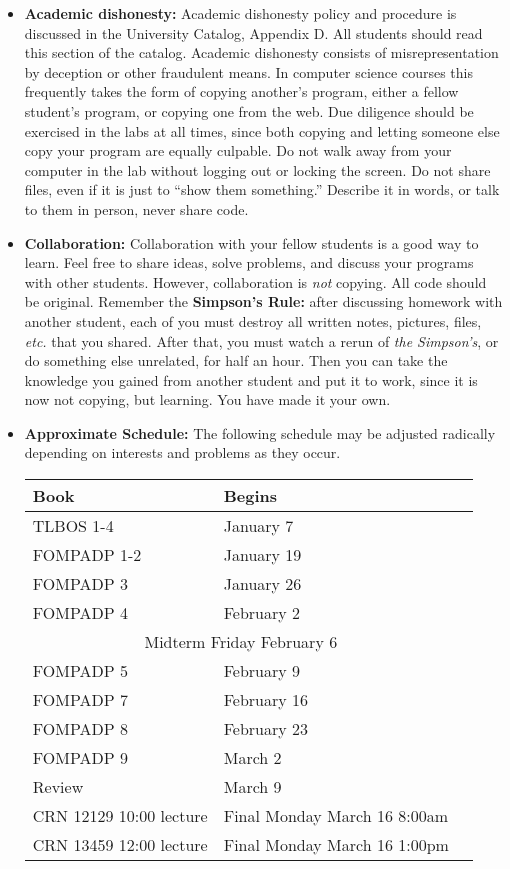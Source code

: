 \documentclass{article}
\begin{document}
\begin{itemize}
\item {\bf Academic dishonesty:} Academic dishonesty policy and
  procedure is discussed in the University Catalog, Appendix D.  All
  students should read this section of the catalog.  Academic
  dishonesty consists of misrepresentation by deception or other
  fraudulent means.  In computer science courses this frequently takes
  the form of copying another's program, either a fellow student's
  program, or copying one from the web.  Due diligence should be
  exercised in the labs at all times, since both copying and letting
  someone else copy your program are equally culpable.  Do not walk
  away from your computer in the lab without logging out or locking
  the screen.  Do not share files, even if it is just to ``show them
  something.''  Describe it in words, or talk to them in person, never
  share code.

\item {\bf Collaboration:} Collaboration with your fellow students is
  a good way to learn.  Feel free to share ideas, solve problems, and
  discuss your programs with other students.  However, collaboration
  is {\em not} copying.  All code should be original.  Remember the
  {\bf Simpson's Rule:} after discussing homework with another
  student, each of you must destroy all written notes, pictures,
  files, {\em etc.} that you shared.  After that, you must watch a
  rerun of {\em the Simpson's}, or do something else unrelated, for
  half an hour.  Then you can take the knowledge you gained from
  another student and put it to work, since it is now not copying, but
  learning.  You have made it your own.

\item
{\bf Approximate Schedule:} The following schedule may be adjusted
radically depending on interests and problems as they occur.

\begin{tabular}{|l|l|l|}\hline
Book & Begins\\\hline
TLBOS  1-4 & January 7 \\
FOMPADP 1-2 & January 19 \\
FOMPADP 3 & January 26\\
FOMPADP 4 & February 2\\\hline
\multicolumn{2}{|c|}{Midterm Friday February 6} \\\hline
FOMPADP 5 & February 9\\
FOMPADP 7 & February 16\\
FOMPADP 8 & February 23\\
FOMPADP 9 & March 2\\
Review &  March 9 \\\hline
{CRN 12129 10:00 lecture}&{Final Monday March 16 8:00am}\\\hline
{CRN 13459 12:00 lecture}&{Final Monday March 16 1:00pm}\\\hline
\end{tabular}
\end{itemize}
\end{document}
